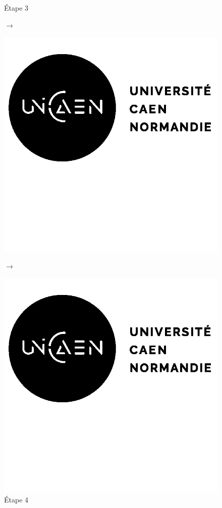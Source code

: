 \documentclass[12pt, a4paper]{article}
\begin{document}
\begin{center}
\begin{figure}[!h]
\begin{minipage}{.3\linewidth}
                    \caption{Étape 3}
                \end{minipage}
            \end{figure}
            \begin{figure}[!h]
                \centering
                $\rightarrow$
                \begin{minipage}{.29\linewidth}
                    \centering
                    \includegraphics[scale=0.2]{img/logo.png}
                    \caption{Étape 4}
                \end{minipage}
                $\rightarrow$
                \begin{minipage}{.3\linewidth}
                    \centering
                    \includegraphics[scale=0.2]{img/logo.png}

\end{minipage}
\end{figure}
\end{center}
\end{document}
